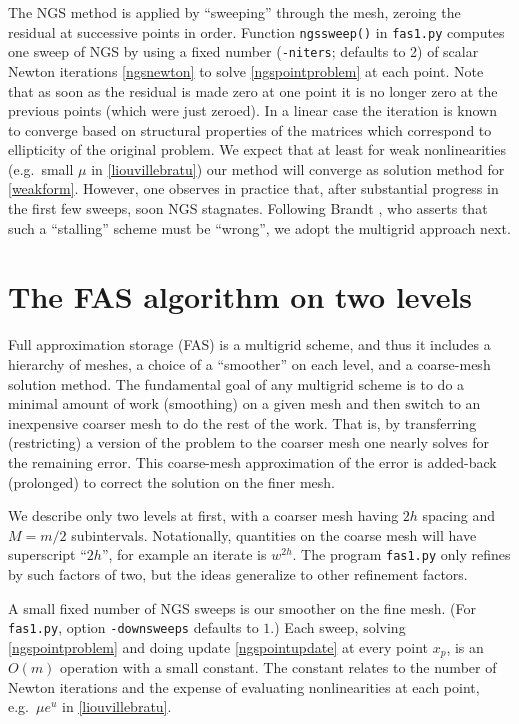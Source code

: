 \documentclass[letterpaper,final,12pt,reqno]{amsart}
\begin{document}
The NGS method is applied by ``sweeping'' through the mesh, zeroing the residual at successive points in order.  Function \texttt{ngssweep()} in \texttt{fas1.py} computes one sweep of NGS by using a fixed number (\texttt{-niters}; defaults to 2) of scalar Newton iterations \eqref{ngsnewton} to solve \eqref{ngspointproblem} at each point.  Note that as soon as the residual is made zero at one point it is no longer zero at the previous points (which were just zeroed).  In a linear case the iteration is known to converge based on structural properties of the matrices \cite[for example]{Greenbaum1997} which correspond to ellipticity of the original problem.  We expect that at least for weak nonlinearities (e.g.~small $\mu$ in \eqref{liouvillebratu}) our method will converge as solution method for \eqref{weakform}.  However, one observes in practice that, after substantial progress in the first few sweeps, soon NGS stagnates.  Following Brandt \cite{Brandt1977}, who asserts that such a ``stalling'' scheme must be ``wrong'', we adopt the multigrid approach next.


\section{The FAS algorithm on two levels}

Full approximation storage (FAS) \cite{Brandt1977,Briggsetal2000} is a multigrid scheme, and thus it includes a hierarchy of meshes, a choice of a ``smoother'' on each level, and a coarse-mesh solution method.  The fundamental goal of any multigrid scheme is to do a minimal amount of work (smoothing) on a given mesh and then switch to an inexpensive coarser mesh to do the rest of the work.  That is, by transferring (restricting) a version of the problem to the coarser mesh one nearly solves for the remaining error.  This coarse-mesh approximation of the error is added-back (prolonged) to correct the solution on the finer mesh.

We describe only two levels at first, with a coarser mesh having $2h$ spacing and $M=m/2$ subintervals.  Notationally, quantities on the coarse mesh will have superscript ``$2h$'', for example an iterate is $w^{2h}$.  The program \texttt{fas1.py} only refines by such factors of two, but the ideas generalize to other refinement factors.

A small fixed number of NGS sweeps is our smoother on the fine mesh.  (For \texttt{fas1.py}, option \texttt{-downsweeps} defaults to $1$.)  Each sweep, solving \eqref{ngspointproblem} and doing update \eqref{ngspointupdate} at every point $x_p$, is an $O(m)$ operation with a small constant.  The constant relates to the number of Newton iterations and the expense of evaluating nonlinearities at each point, e.g.~$\mu e^u$ in \eqref{liouvillebratu}.
\end{document}
